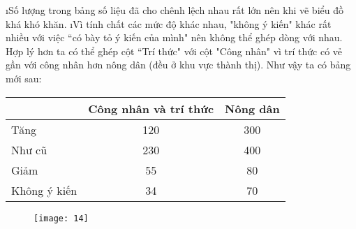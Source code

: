\begin{Answer}{18}
		\begin{enumerate}[a),leftmargin=*]
			\i Số lượng trong bảng số liệu đã cho chênh lệch nhau rất lớn nên khi vẽ biểu đồ khá khó khăn.
			\i Vì tính chất các mức độ khác nhau, "không ý kiến" khác rất nhiều với việc  ``có bày tỏ ý kiến của mình" nên không thể ghép dòng với nhau. Hợp lý hơn ta có thể ghép cột  ``Trí thức" với cột "Công nhân" vì trí thức có vẻ gần với công nhân hơn nông dân (đều ở khu vực thành thị). Như vậy ta có bảng mới sau:
			\begin{center}
				\begin{tabular}{|l|c|c|}
					\hline
					&Công nhân và trí thức&	Nông dân\\
					\hline
					Tăng&	120&	300\\
					\hline
					Như cũ&	230&	400\\
					\hline
					Giảm&	55&	80\\
					\hline
					Không ý kiến&	34&	70\\
					\hline
				\end{tabular}
			\end{center}
		\end{enumerate}
		\begin{figure}[H]
			\centering
			\vspace*{-5pt}
			\captionsetup{labelformat= empty, justification=centering}
			\texttt{[image: 14]}
			\vspace*{-10pt}
		\end{figure}
	
\end{Answer}
